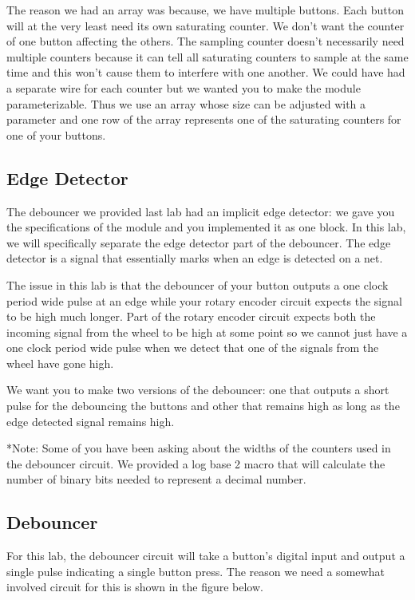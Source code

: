 \documentclass[11pt]{article}
\begin{document}
The reason we had an array was because, we have multiple buttons. Each button will at the very least need its own saturating counter. We don't want the counter of one button affecting the others. The sampling counter doesn't necessarily need multiple counters because it can tell all saturating counters to sample at the same time and this won't cause them to interfere with one another. We could have had a separate wire for each counter but we wanted you to make the module parameterizable. Thus we use an array whose size can be adjusted with a parameter and one row of the array represents one of the saturating counters for one of your buttons. 

\subsection{Edge Detector}

The debouncer we provided last lab had an implicit edge detector: we gave you the specifications of the module and you implemented it as one block. In this lab, we will specifically separate the edge detector part of the debouncer. The edge detector is a signal that essentially marks when an edge is detected on a net. 

The issue in this lab is that the debouncer of your button outputs a one clock period wide pulse at an edge while your rotary encoder circuit expects the signal to be high much longer. Part of the rotary encoder circuit expects both the incoming signal from the wheel to be high at some point so we cannot just have a one clock period wide pulse when we detect that one of the signals from the wheel have gone high.

We want you to make two versions of the debouncer: one that outputs a short pulse for the debouncing the buttons and other that remains high as long as the edge detected signal remains high. 

*Note: Some of you have been asking about the widths of the counters used in the debouncer circuit. We provided a log base 2 macro that will calculate the number of binary bits needed to represent a decimal number. 

\subsection{Debouncer}

For this lab, the debouncer circuit will take a button's digital input and output a single pulse indicating a single button press. The reason we need a somewhat involved circuit for this is shown in the figure below.
\end{document}
